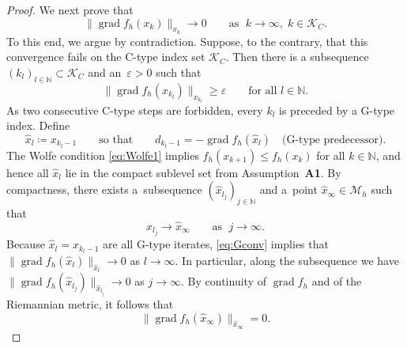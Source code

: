 \documentclass[11pt,reqno]{amsart}
\theoremstyle{plain}
\newcommand\N{\mathbb N}
\DeclareMathOperator{\grad}{grad}
\newcommand\calK{\mathcal K}
\newcommand{\M}{\mathcal{M}}
\begin{document}
\begin{proof}
		We next prove that
		\begin{equation}\label{eq:Cconv}
			\|\grad f_h(x_k)\|_{x_k} \rightarrow 0\qquad \text{as } \;k\rightarrow\infty, \; k\in\calK_C.
		\end{equation}
		To this end, we argue by contradiction. Suppose, to the contrary, that this convergence fails on the C-type index set $\calK_C$. Then there is a subsequence $(k_l)_{l \in \N}\subset \calK_C$ and an~$\varepsilon > 0$ such that
		\begin{equation}\label{eq:contra}
			\|\grad f_h(x_{k_l})\|_{x_{k_l}} \geq \varepsilon
			\qquad\text{for all } l \in \N.
		\end{equation}
		As two consecutive C-type steps are forbidden, every $k_l$ is preceded by a
		G-type index. Define
		\[
		\hat{x}_l \coloneqq x_{k_l - 1}
		\qquad\text{so that}\qquad
		d_{k_l - 1} = -\grad f_h(\hat{x}_l)
		\quad\text{(G-type predecessor).}
		\]
		The Wolfe condition \eqref{eq:Wolfe1} implies $f_h(x_{k+1}) \le f_h(x_k)$ for all $k\in\N$, and hence all $\hat{x}_l$ lie in the compact sublevel set from Assumption~\textbf{A1}. By compactness, there exists a~subsequence $(\hat{x}_{l_j})_{j \in \N}$ and a~point $\hat{x}_\infty \in \M_h$ such that 
		\begin{equation}\label{eq:yinf}
			\hat{x}_{l_j} \rightarrow \hat{x}_\infty \qquad\text{as } \;j \rightarrow \infty.
		\end{equation}
		Because $\hat{x}_l = x_{k_l - 1}$ are all G-type iterates, \eqref{eq:Gconv} implies that $\|\grad f_h(\hat{x}_l)\|_{\hat{x}_l} \rightarrow 0$ as $l \rightarrow \infty$.
		In particular, along the subsequence we have
		$\|\grad f_h(\hat{x}_{l_j})\|_{\hat{x}_{l_j}} \rightarrow 0$ as $j \rightarrow \infty$.
		By continuity of $\grad f_h$ and of the Riemannian metric, it follows that 
		\begin{equation}\label{eq:gradzero}
			\|\grad f_h(\hat{x}_\infty)\|_{\hat{x}_\infty} = 0.
		\end{equation}
		

\end{proof}
\end{document}
